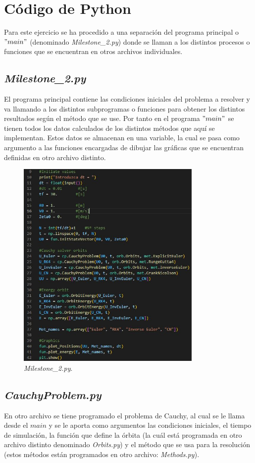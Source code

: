\documentclass[12pt,a4paper]{article}
\begin{document}
\section{Código de Python}
Para este ejercicio se ha procedido a una separación del programa principal o $"main"$ (denominado \textit{Milestone\_2.py}) donde se llaman a los distintos procesos o funciones que se encuentran en otros archivos individuales.

\subsection{\textit{Milestone\_2.py}}
El programa principal contiene las condiciones iniciales del problema a resolver y va llamando a los distintos subprogramas o funciones para obtener los distintos resultados según el método que se use. Por tanto en el programa $"main"$ se tienen todos los datos calculados de los distintos métodos que aquí se implementan. Estos datos se almacenan en una variable, la cual se pasa como argumento a las funciones encargadas de dibujar las gráficas que se encuentran definidas en otro archivo distinto.
\begin{figure}[H] 
	\centering
	\includegraphics[width=0.8\textwidth]{FIGURES/Codigo/main.jpg}
	\caption{\textit{Milestone\_2.py}.}
\end{figure}

\subsection{\textit{CauchyProblem.py}}
En otro archivo se tiene programado el problema de Cauchy, al cual se le llama desde el $main$ y se le aporta como argumentos las condiciones iniciales, el tiempo de simulación, la función que define la órbita (la cuál está programada en otro archivo distinto denominado  \textit{Orbits.py}) y el método que se usa para la resolución (estos métodos están programados en otro archivo: \textit{Methods.py}). 
\end{document}
